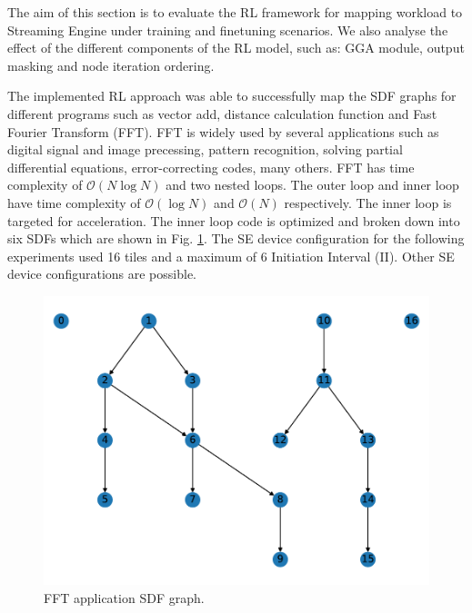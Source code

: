 
The aim of this section is to evaluate the RL framework for mapping workload to Streaming Engine under training and finetuning scenarios. 
We also analyse the effect of the different components of the RL model, such as: GGA module, output masking and node iteration ordering.

The implemented RL approach was able to successfully map the SDF graphs for different programs such as vector add, distance calculation function and Fast Fourier Transform (FFT). 
FFT is widely used by several applications such as digital signal and image precessing, pattern recognition, solving partial differential equations, error-correcting codes, many others\cite{814659}.
FFT has time complexity of $\mathcal{O}(N\log{N})$ and two nested loops.
The outer loop and inner loop have time complexity of $\mathcal{O}(\log{N})$ and $\mathcal{O}(N)$ respectively.
The inner loop is targeted for acceleration.
The inner loop code is optimized and broken down into six SDFs which are shown in Fig. \ref{fig:ifft_graph}.
The SE device configuration for the following experiments used 16 tiles and a maximum of 6 Initiation Interval (II).
Other SE device configurations are possible.

\begin{figure}[h]
  \centering
  \includegraphics[width=\linewidth]{fig/ifft_graph.pdf}
  \caption{FFT application SDF graph.}
  \label{fig:ifft_graph}
\end{figure}


